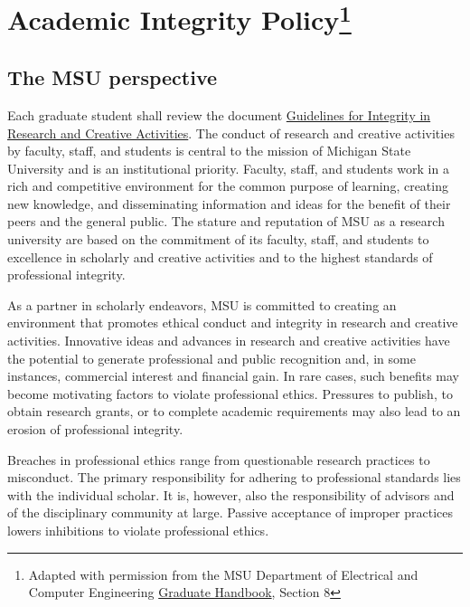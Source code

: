 \section[Academic Integrity Policy]{Academic Integrity
  Policy\footnote{Adapted with permission from the MSU
    Department of Electrical and Computer Engineering
    \href{https://ece.msu.edu/sites/default/files/content/Graduate-Student-Handbook\%20-\%203-26-12\%20_0.pdf}{Graduate
      Handbook}, Section 8}}

\subsection{The MSU perspective}

Each graduate student shall review the document
\href{https://grad.msu.edu/sites/default/files/content/researchintegrity/guidelines.pdf}{Guidelines
  for Integrity in Research and Creative Activities}.   The conduct of research and creative activities by
faculty, staff, and students is central to the mission of Michigan
State University and is an institutional priority. Faculty, staff, and
students work in a rich and competitive environment for the common
purpose of learning, creating new knowledge, and disseminating
information and ideas for the benefit of their peers and the general
public. The stature and reputation of MSU as a research university are
based on the commitment of its faculty, staff, and students to
excellence in scholarly and creative activities and to the highest
standards of professional integrity.  

As a partner in scholarly endeavors, MSU is committed to creating an
environment that promotes ethical conduct and integrity in research
and creative activities. Innovative ideas and advances in research and
creative activities have the potential to generate professional and
public recognition and, in some instances, commercial interest and
financial gain. In rare cases, such benefits may become motivating
factors to violate professional ethics. Pressures to publish, to
obtain research grants, or to complete academic requirements may also
lead to an erosion of professional integrity.  

Breaches in professional ethics range from questionable research
practices to misconduct. The primary responsibility for adhering to
professional standards lies with the individual scholar. It is,
however, also the responsibility of advisors and of the disciplinary
community at large. Passive acceptance of improper practices lowers
inhibitions to violate professional ethics. 

